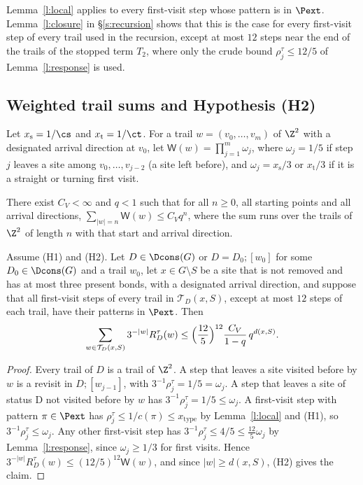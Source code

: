 \begin{remark}
Lemma~\ref{l:local} applies to every first-visit step whose pattern is in $\Pext$. Lemma~\ref{l:closure} in \S\ref{s:recursion} shows that this is the case for every first-visit step of every trail used in the recursion, except at most $12$ steps near the end of the trails of the stopped term $T_2$, where only the crude bound $\rho^\tau_j \le 12/5$ of Lemma~\ref{l:response} is used.
\end{remark}

\subsection{Weighted trail sums and Hypothesis (H2)}\label{s:H2def}

Let $x_{\mathrm s} = 1/\cs$ and $x_{\mathrm t} = 1/\ct$. For a trail $w = (v_0, \dots, v_m)$ of $\Z^2$ with a designated arrival direction at $v_0$, let $\mathsf W(w) = \prod_{j = 1}^m \omega_j$, where $\omega_j = 1/5$ if step $j$ leaves a site among $v_0, \dots, v_{j - 2}$ (a site left before), and $\omega_j = x_{\mathrm s}/3$ or $x_{\mathrm t}/3$ if it is a straight or turning first visit.

\begin{hypothesis}[H2]\label{h:H2}
There exist $C_V < \infty$ and $q < 1$ such that for all $n \ge 0$, all starting points and all arrival directions, $\sum_{|w| = n} \mathsf W(w) \le C_V q^n$, where the sum runs over the trails of $\Z^2$ of length $n$ with that start and arrival direction.
\end{hypothesis}

\begin{lemma}\label{l:onepoint}
Assume (H1) and (H2). Let $D \in \Dcons(G)$ or $D = D_0;[w_0]$ for some $D_0 \in \Dcons(G)$ and a trail $w_0$, let $x \in G \setminus S$ be a site that is not removed and has at most three present bonds, with a designated arrival direction, and suppose that all first-visit steps of every trail in $\mathcal T_D(x, S)$, except at most $12$ steps of each trail, have their patterns in $\Pext$. Then
\begin{equation*}
\sum_{w \in \mathcal T_D(x, S)} 3^{-|w|} R^\tau_D(w) \le \Bigl( \frac{12}{5} \Bigr)^{12} \frac{C_V}{1 - q} \, q^{d(x, S)} .
\end{equation*}
\end{lemma}

\begin{proof}
Every trail of $D$ is a trail of $\Z^2$. A step that leaves a site visited before by $w$ is a revisit in $D;[w_{j - 1}]$, with $3^{-1} \rho^\tau_j = 1/5 = \omega_j$. A step that leaves a site of status $\mathrm D$ not visited before by $w$ has $3^{-1} \rho^\tau_j = 1/5 \le \omega_j$. A first-visit step with pattern $\pi \in \Pext$ has $\rho^\tau_j \le 1/c(\pi) \le x_{\mathrm{type}}$ by Lemma~\ref{l:local} and (H1), so $3^{-1} \rho^\tau_j \le \omega_j$. Any other first-visit step has $3^{-1} \rho^\tau_j \le 4/5 \le \frac{12}{5} \omega_j$ by Lemma~\ref{l:response}, since $\omega_j \ge 1/3$ for first visits. Hence $3^{-|w|} R^\tau_D(w) \le (12/5)^{12} \mathsf W(w)$, and since $|w| \ge d(x, S)$, (H2) gives the claim.
\end{proof}
